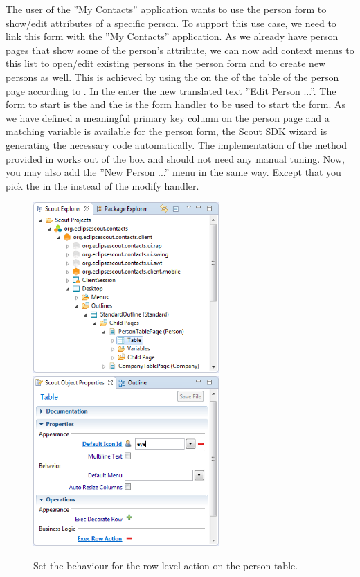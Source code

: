 \documentclass[a4paper,10pt,twoside]{book}
\begin{document}
The user of the ''My Contacts'' application wants to use the person form to show/edit attributes of a specific person.
To support this use case, we need to link this form with the ''My Contacts'' application. 
As we already have person pages that show some of the person's attribute, we can now add context menus to this list to open/edit existing persons in the person form and to create new persons as well. 
This is achieved by using the  on the  of the table of the person page according to . 
In the  enter the new translated text ''Edit Person ...''. 
The form to start is the  and the  is the form handler to be used to start the form. 
As we have defined a meaningful primary key column on the person page and a matching variable is available for the person form, the Scout SDK wizard is generating the necessary code automatically. 
The implementation of the  method provided in  works out of the box and should not need any manual tuning.
Now, you may also add the ''New Person ...'' menu in the same way. 
Except that you pick the  in the  instead of the modify handler. 

\begin{figure}
\includegraphics[height=6.5cm]{person_table_explorer.png} \hspace{5mm}
\includegraphics[height=6.5cm]{person_table_properties.png}
\caption{Set the behaviour for the row level action on the person table.}
\end{figure}
\end{document}
